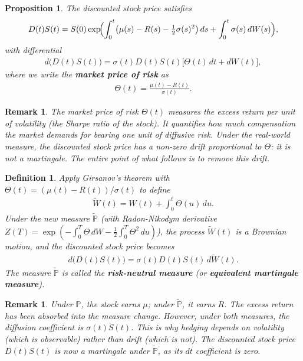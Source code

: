 \documentclass{report}
\theoremstyle{spacedplain}
\newtheorem{proposition}[theorem]{Proposition}
\theoremstyle{spaceddefinition}
\newtheorem{definition}[theorem]{Definition}
\theoremstyle{spacedremark}
\newtheorem{remark}[theorem]{Remark}
\begin{document}
\begin{proposition}
The discounted stock price satisfies
\begin{align}
    D(t)S(t) = S(0)\exp\!\Bigl(\int_0^t\bigl(\mu(s) - R(s) - \tfrac{1}{2}\sigma(s)^2\bigr)\,ds + \int_0^t \sigma(s)\,dW(s)\Bigr),
\end{align}
with differential
\begin{align}
    d\bigl(D(t)S(t)\bigr) = \sigma(t)D(t)S(t)\bigl[\Theta(t)\,dt + dW(t)\bigr],
\end{align}
where we write the \textbf{market price of risk} as
\begin{align}
    \Theta(t) = \frac{\mu(t) - R(t)}{\sigma(t)}.
\end{align}
\end{proposition}

\begin{remark}
The market price of risk $\Theta(t)$ measures the excess return per unit of volatility (the Sharpe ratio of the stock). It quantifies how much compensation the market demands for bearing one unit of diffusive risk. Under the real-world measure, the discounted stock price has a non-zero drift proportional to $\Theta$: it is not a martingale. The entire point of what follows is to remove this drift.
\end{remark}

\begin{definition}
Apply Girsanov's theorem with $\Theta(t) = (\mu(t)-R(t))/\sigma(t)$ to define
\begin{align}
    \widetilde{W}(t) = W(t) + \int_0^t \Theta(u)\,du.
\end{align}
Under the new measure $\widetilde{\mathbb{P}}$ (with Radon-Nikodym derivative $Z(T) = \exp(-\int_0^T\Theta\,dW - \frac{1}{2}\int_0^T\Theta^2\,du)$), the process $\widetilde{W}(t)$ is a Brownian motion, and the discounted stock price becomes
\begin{align}
    d\bigl(D(t)S(t)\bigr) = \sigma(t)D(t)S(t)\,d\widetilde{W}(t).
\end{align}
The measure $\widetilde{\mathbb{P}}$ is called the \textbf{risk-neutral measure} (or \textbf{equivalent martingale measure}).
\end{definition}

\begin{remark} Under $\mathbb{P}$, the stock earns $\mu$; under $\widetilde{\mathbb{P}}$, it earns $R$. The excess return has been absorbed into the measure change. However, under both measures, the diffusion coefficient is $\sigma(t)S(t)$. This is why hedging depends on volatility (which is observable) rather than drift (which is not). The discounted stock price $D(t)S(t)$ is now a martingale under $\widetilde{\mathbb{P}}$, as its $dt$ coefficient is zero.
\end{remark}
\end{document}
